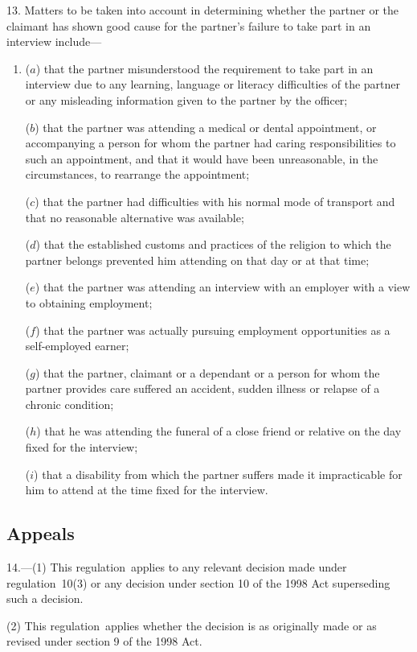 \documentclass[12pt,a4paper]{article}
\begin{document}
13.  Matters to be taken into account in determining whether the partner or the claimant has shown good cause for the partner’s failure to take part in an interview include—
\begin{enumerate}\item[]
($a$) that the partner misunderstood the requirement to take part in an interview due to any learning, language or literacy difficulties of the partner or any misleading information given to the partner by the officer;

($b$) that the partner was attending a medical or dental appointment, or accompanying a person for whom the partner had caring responsibilities to such an appointment, and that it would have been unreasonable, in the circumstances, to rearrange the appointment;

($c$) that the partner had difficulties with his normal mode of transport and that no reasonable alternative was available;

($d$) that the established customs and practices of the religion to which the partner belongs prevented him attending on that day or at that time;

($e$) that the partner was attending an interview with an employer with a view to obtaining employment;

($f$) that the partner was actually pursuing employment opportunities as a self-employed earner;

($g$) that the partner, claimant or a dependant or a person for whom the partner provides care suffered an accident, sudden illness or relapse of a chronic condition;

($h$) that he was attending the funeral of a close friend or relative on the day fixed for the interview;

($i$) that a disability from which the partner suffers made it impracticable for him to attend at the time fixed for the interview.
\end{enumerate}

\subsection[14. Appeals]{Appeals}

14.---(1)  This regulation~applies to any relevant decision made under regulation~10(3) or any decision under section 10 of the 1998 Act superseding such a decision.

(2) This regulation~applies whether the decision is as originally made or as revised under section 9 of the 1998 Act.
\end{document}
